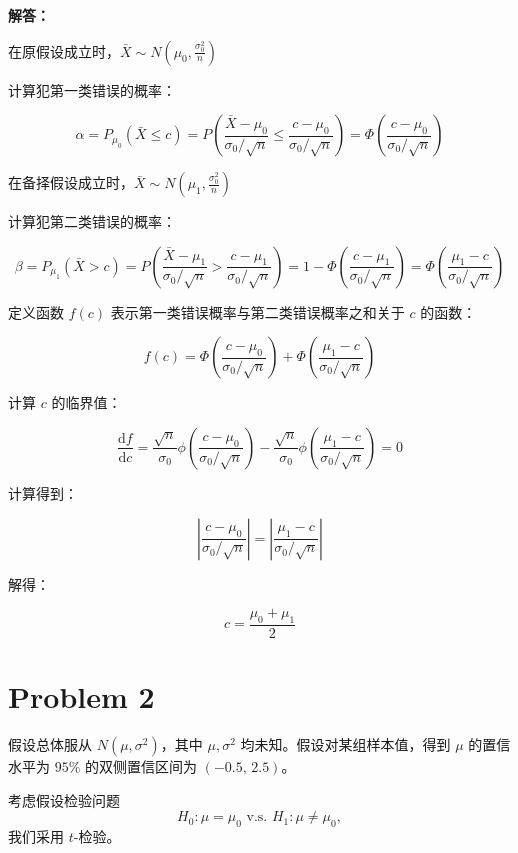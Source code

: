 \documentclass[12pt,a4paper]{article}
\begin{document}
\begin{answerbox}
\textbf{解答：}

在原假设成立时，$\bar{X} \sim N\left(\mu_0, \frac{\sigma_0^2}{n}\right)$

计算犯第一类错误的概率：

$$
\alpha = P_{\mu_0}\left(\bar{X} \leq c\right) = P\left(\frac{\bar{X}-\mu_0}{\sigma_0/\sqrt{n}} \leq \frac{c-\mu_0}{\sigma_0/\sqrt{n}}\right) = \Phi\left(\frac{c-\mu_0}{\sigma_0/\sqrt{n}}\right)
$$

在备择假设成立时，$\bar{X} \sim N\left(\mu_1, \frac{\sigma_0^2}{n}\right)$

计算犯第二类错误的概率：

$$
\beta = P_{\mu_1}\left(\bar{X} > c\right) = P\left(\frac{\bar{X}-\mu_1}{\sigma_0/\sqrt{n}} > \frac{c-\mu_1}{\sigma_0/\sqrt{n}}\right) = 1-\Phi\left(\frac{c-\mu_1}{\sigma_0/\sqrt{n}}\right) = \Phi\left(\frac{\mu_1-c}{\sigma_0/\sqrt{n}}\right)
$$

定义函数 $f(c)$ 表示第一类错误概率与第二类错误概率之和关于 $c$ 的函数：

$$
f(c) = \Phi\left(\frac{c-\mu_0}{\sigma_0/\sqrt{n}}\right) + \Phi\left(\frac{\mu_1-c}{\sigma_0/\sqrt{n}}\right)
$$

计算 $c$ 的临界值：

$$
\frac{\text{d}f}{\text{d}c} = \frac{\sqrt{n}}{\sigma_0} \phi\left(\frac{c-\mu_0}{\sigma_0/\sqrt{n}}\right) - \frac{\sqrt{n}}{\sigma_0} \phi\left(\frac{\mu_1-c}{\sigma_0/\sqrt{n}}\right) = 0
$$

计算得到：

$$
\left|\frac{c-\mu_0}{\sigma_0/\sqrt{n}}\right| = \left|\frac{\mu_1-c}{\sigma_0/\sqrt{n}}\right|
$$

解得：

$$
c = \frac{\mu_0+\mu_1}{2}
$$

\end{answerbox}

\section{Problem 2}

假设总体服从 $N(\mu,\sigma^2)$，其中 $\mu,\sigma^2$ 均未知。假设对某组样本值，得到 $\mu$ 的置信水平为 $95\%$ 的双侧置信区间为 $(-0.5,\,2.5)$。

考虑假设检验问题
\[
H_0: \mu = \mu_0 \,\,\text{v.s.}\,\, H_1: \mu \ne \mu_0,
\]
我们采用 $t$-检验。

\subsection{}
\end{document}
